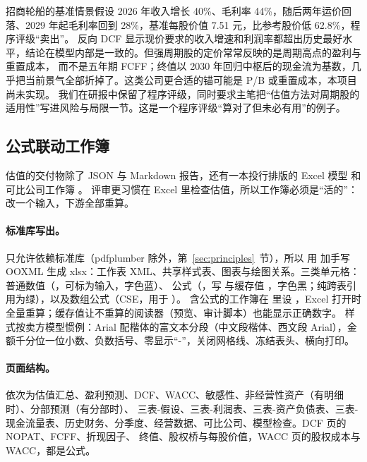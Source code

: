 \begin{failcase}
招商轮船的基准情景假设 2026 年收入增长 40\%、毛利率 44\%，随后两年运价回落、2029 年起毛利率回到 28\%，基准每股价值 7.51 元，比参考股价低 62.8\%，程序评级“卖出”。
反向 DCF 显示现价要求的收入增速和利润率都超出历史最好水平，结论在模型内部是一致的。但强周期股的定价常常反映的是周期高点的盈利与重置成本，
而不是五年期 FCFF；终值以 2030 年回归中枢后的现金流为基数，几乎把当前景气全部折掉了。这类公司更合适的锚可能是 P/B 或重置成本，本项目尚未实现。
我们在研报中保留了程序评级，同时要求主笔把“估值方法对周期股的适用性”写进风险与局限一节。这是一个程序评级“算对了但未必有用”的例子。
\end{failcase}

\subsection{公式联动工作簿}
\label{sec:val-workbook}

估值的交付物除了 JSON 与 Markdown 报告，还有一本投行排版的 Excel 模型  和可比公司工作簿 。
评审更习惯在 Excel 里检查估值，所以工作簿必须是“活的”：改一个输入，下游全部重算。

\paragraph{标准库写出。}  只允许依赖标准库（pdfplumber 除外，第~\ref{sec:principles}~节），所以  用 
加手写 OOXML 生成 xlsx：工作表 XML、共享样式表、图表与绘图关系。三类单元格：普通数值（，可标为输入，字色蓝）、
公式（，写  与缓存值 ，字色黑；纯跨表引用为绿），以及数组公式（CSE，用于 ）。
含公式的工作簿在  里设 ，Excel 打开时全量重算；缓存值让不重算的阅读器（预览、审计脚本）也能显示正确数字。
样式按卖方模型惯例：Arial 配楷体的富文本分段（中文段楷体、西文段 Arial），金额千分位一位小数、负数括号、零显示“-”，关闭网格线、冻结表头、横向打印。

\paragraph{页面结构。}  依次为估值汇总、盈利预测、DCF、WACC、敏感性、非经营性资产（有明细时）、分部预测（有分部时）、
三表-假设、三表-利润表、三表-资产负债表、三表-现金流量表、历史财务、分季度、经营数据、可比公司、模型检查。DCF 页的 NOPAT、FCFF、折现因子、
终值、股权桥与每股价值，WACC 页的股权成本与 WACC，都是公式。

